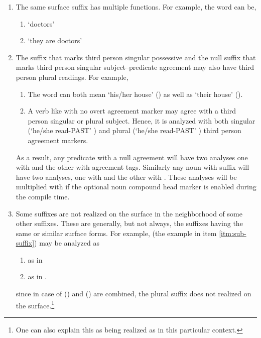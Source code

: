 \documentclass[twocolumn]{article}
\begin{document}
\begin{enumerate}
\begin{enumerate}
    \end{enumerate}
\item\label{itm:different-func} The same surface suffix has multiple
functions. For example, the word  can be,
    \begin{enumerate}
        \item {} `doctors'
        \item {} `they are doctors'
    \end{enumerate}
\item\label{itm:3p-3s} The suffix  that marks third person
singular possessive and the null suffix that marks third person
singular subject--predicate agreement may also have third person
plural readings. For example,
    \begin{enumerate}
    \item The word  can both mean `his/her house'
        () as well as `their house' ().
    \item A verb like  with no overt
    agreement marker may agree with a third person singular or plural
    subject. Hence, it is analyzed with 
    both singular (`he/she read-PAST' ) 
    and plural (`he/she read-PAST' ) 
    third person agreement markers.
    \end{enumerate}

As a result, any predicate with a null agreement will have two
analyses one with   and the other with  agreement
tags. Similarly any noun with suffix  will have two
analyses, one with  and the other with . These
analyses will be multiplied with  if the optional noun
compound head marker is enabled during the compile time.

\item\label{itm:null-suffix} Some suffixes are not realized on the surface in the neighborhood of some other suffixes. These are generally, but not always, the suffixes having the same or similar surface forms. For example,  (the example in item \ref{itm:sub-suffix}) may be analyzed as
    \begin{enumerate}
        \item {}  as in 
        \item {} as in .
    \end{enumerate}
since in case of  () and  ()
are combined, the plural suffix  does not realized on the
surface.\footnote{One can also explain this as  being
realized as  in this particular context.}


\end{enumerate}
\end{document}
